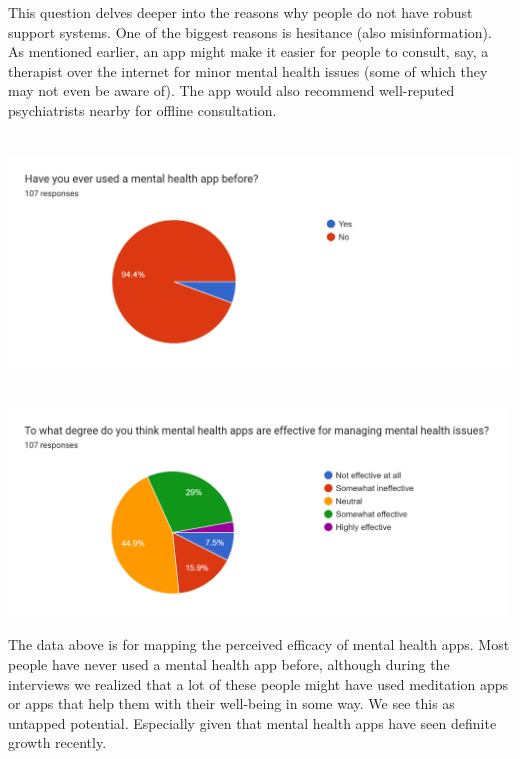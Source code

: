 \documentclass[manuscript,screen,review]{acmart}
\begin{document}
This question delves deeper into the reasons why people do not have
robust support systems. One of the biggest reasons is hesitance (also
misinformation). As mentioned earlier, an app might make it easier for
people to consult, say, a therapist over the internet for minor mental
health issues (some of which they may not even be aware of). The app
would also recommend well-reputed psychiatrists nearby for offline
consultation.

\includegraphics[width=6.26806in,height=2.63889in]{vertopal.com_Survey analysis/vertopal_0d4ab446a1ae41f4824d7f0aaede9ca1/media/image7.png}

\includegraphics[width=5.2037in,height=2.19079in]{vertopal.com_Survey analysis/vertopal_0d4ab446a1ae41f4824d7f0aaede9ca1/media/image8.png}

The data above is for mapping the perceived efficacy of mental health
apps. Most people have never used a mental health app before, although
during the interviews we realized that a lot of these people might have
used meditation apps or apps that help them with their well-being in
some way. We see this as untapped potential. Especially given that
mental health apps have seen definite growth recently.
\end{document}

